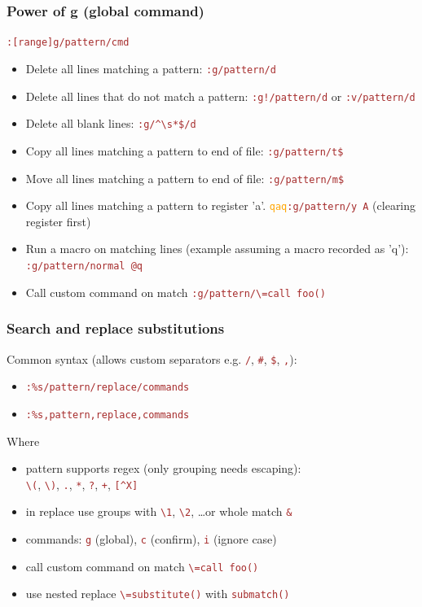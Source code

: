 \documentclass{beamer}
\newcommand{\vimnormal}[1]{\texttt{\textcolor{orange}{#1}}}
\newcommand{\vimcommand}[1]{\texttt{\textcolor{brown}{#1}}}
\begin{document}
\begin{frame}
  \frametitle{Power of g (global command)}
  \vimcommand{:[range]g/pattern/cmd}

  \begin{itemize}
    \item Delete all lines matching a pattern: \vimcommand{:g/pattern/d}
    \item Delete all lines that do not match a pattern: \vimcommand{:g!/pattern/d} or \vimcommand{:v/pattern/d}
    \item Delete all blank lines: \vimcommand{:g/\string^\textbackslash{s}*\$/d}
    \item Copy all lines matching a pattern to end of file: \vimcommand{:g/pattern/t\$}
    \item Move all lines matching a pattern to end of file: \vimcommand{:g/pattern/m\$}
    \item Copy all lines matching a pattern to register 'a'. \vimnormal{qaq}\vimcommand{:g/pattern/y A} (clearing register first)
    \item Run a macro on matching lines (example assuming a macro recorded as 'q'): \vimcommand{:g/pattern/normal @q}
    \item Call custom command on match \vimcommand{:g/pattern/\textbackslash{=}call foo()}
  \end{itemize}
\end{frame}

\begin{frame}
    \frametitle{Search and replace substitutions}
    Common syntax (allows custom separators e.g. \vimcommand{/}, \vimcommand{\#}, \vimcommand{\$}, \vimcommand{,}):
    {\footnotesize 
    \begin{itemize}
        \item \vimcommand{:\%s/pattern/replace/commands}
        \item \vimcommand{:\%s,pattern,replace,commands}
    \end{itemize}
    }
    Where
    \begin{itemize}
        \item pattern supports regex (only grouping needs escaping):\\
          \vimcommand{\textbackslash{(}}, \vimcommand{\textbackslash{)}}, \vimcommand{.}, \vimcommand{*}, \vimcommand{?}, \vimcommand{+}, \vimcommand{[\string^X]}
        \item in replace use groups with \vimcommand{\textbackslash{1}}, \vimcommand{\textbackslash{2}}, \ldots or whole match \vimcommand{\&}
        \item commands: \vimcommand{g} (global), \vimcommand{c} (confirm), \vimcommand{i} (ignore case)
        \item call custom command on match \vimcommand{\textbackslash{=}call foo()}
        \item use nested replace \vimcommand{\textbackslash{=}substitute()} with \vimcommand{submatch()}
    \end{itemize}
\end{frame}
\end{document}
